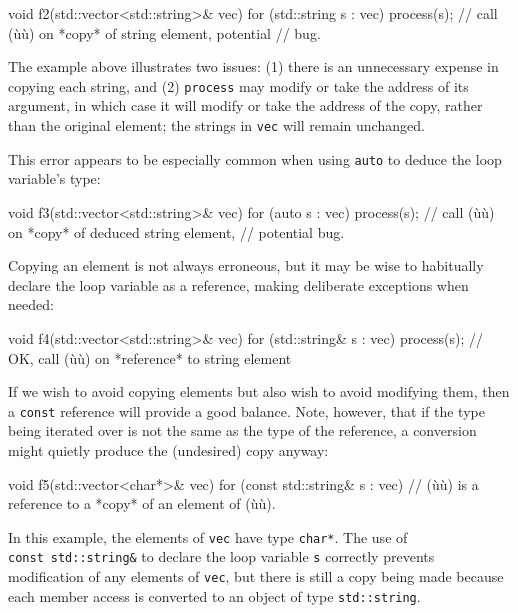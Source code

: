{{{\begin{emcppslisting}
void f2(std::vector<std::string>& vec)
{
    for (std::string s : vec)
    {
        process(s);  // call (ù{}ù) on *copy* of string element, potential
                     // bug.
    }
}
\end{emcppslisting}
    

\noindent The example above illustrates two issues: (1) there is an unnecessary
expense in copying each string, and (2) \lstinline!process! may modify or
take the address of its argument, in which case it will modify or take
the address of the copy, rather than the original element; the strings
in \lstinline!vec! will remain unchanged.

This error appears to be especially common when using \lstinline!auto! to
deduce the loop variable's type:

\begin{emcppslisting}
void f3(std::vector<std::string>& vec)
{
    for (auto s : vec)
    {
        process(s);  // call (ù{}ù) on *copy* of deduced string element,
                     // potential bug.
    }
}
\end{emcppslisting}
    

\noindent Copying an element is not always erroneous, but it may be wise to
habitually declare the loop variable as a reference, making deliberate
exceptions when needed:

\begin{emcppslisting}
void f4(std::vector<std::string>& vec)
{
    for (std::string& s : vec)
    {
        process(s);  // OK, call (ù{}ù) on *reference* to string element
    }
}
\end{emcppslisting}
    

\noindent If we wish to avoid copying elements but also wish to avoid modifying
them, then a \lstinline!const! reference will provide a good balance. Note,
however, that if the type being iterated over is not the same as the
type of the reference, a conversion might quietly produce the
(undesired) copy anyway:

\begin{emcppslisting}
void f5(std::vector<char*>& vec)
{
    for (const std::string& s : vec)
    {
        // (ù{}ù) is a reference to a *copy* of an element of (ù{}ù).
    }
}
\end{emcppslisting}
    

\noindent In this example, the elements of \lstinline!vec! have type \lstinline!char*!.
The use of \lstinline!const!~\lstinline!std::string&! to declare the loop
variable \lstinline!s! correctly prevents modification of any elements of
\lstinline!vec!, but there is still a copy being made because each member
access is converted to an object of type \lstinline!std::string!.

}}}
